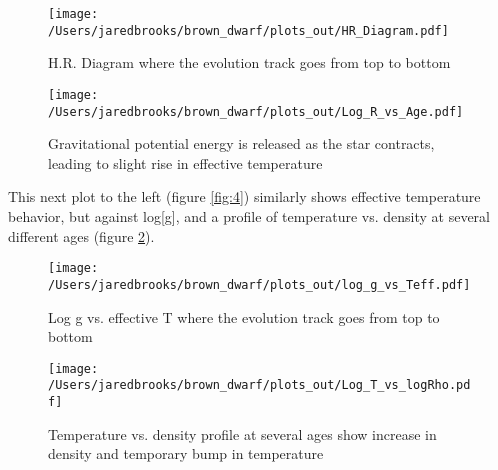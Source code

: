 \documentclass{article}
\begin{document}
        \begin{figure}[H]
                \begin{minipage}[b]{0.5\linewidth}
                       \centering
                       \texttt{[image: /Users/jaredbrooks/brown\_dwarf/plots\_out/HR\_Diagram.pdf]}
                       \caption{\footnotesize H.R. Diagram where the evolution track goes from top to bottom}
                       \label{fig:2}
                \end{minipage}
                \hspace{0cm}
                \begin{minipage}[b]{0.5\linewidth}
                       \centering
                       \texttt{[image: /Users/jaredbrooks/brown\_dwarf/plots\_out/Log\_R\_vs\_Age.pdf]}
                       \caption{\footnotesize Gravitational potential energy is released as the star contracts, leading to slight rise in effective temperature}
                       \label{fig:3}
                \end{minipage}
        \end{figure}

        This next plot to the left (figure \ref{fig:4}) similarly shows effective temperature behavior, but against log[g], and a profile of temperature vs. density at several different ages (figure \ref{fig:5}).

        \begin{figure}[H]
                \begin{minipage}{0.5\linewidth}
                       \centering
                       \texttt{[image: /Users/jaredbrooks/brown\_dwarf/plots\_out/log\_g\_vs\_Teff.pdf]}
                       \caption{\footnotesize Log g vs. effective T where the evolution track goes from top to bottom}
                       \label{fig:4}
                       \end{minipage}
                \hspace{0cm}
                \begin{minipage}{0.5\linewidth}
                       \centering
                       \texttt{[image: /Users/jaredbrooks/brown\_dwarf/plots\_out/Log\_T\_vs\_logRho.pdf]}
                       \caption{\footnotesize Temperature vs. density profile at several ages show increase in density and temporary bump in temperature}
                       \label{fig:5}
                \end{minipage}
        \end{figure}
\end{document}
